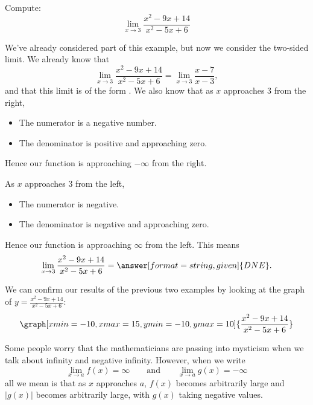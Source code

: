 \documentclass{ximera}
\begin{document}
\begin{example}
  Compute:
  \[
  \lim_{x\to 3} \frac{x^2-9x+14}{x^2-5x+6}
  \]
  \begin{explanation}
    We've already considered part of this example, but now we consider the two-sided limit. We already know that
    \[
    \lim_{x\to 3} \frac{x^2-9x+14}{x^2-5x+6} = \lim_{x\to
      3}\frac{x-7}{x-3},
    \]
    and that this limit is of the form \numOverZero.
    We also know that as $x$ approaches $3$ from the right,
    \begin{itemize}
    \item The numerator is a negative number. 
    \item The denominator is positive and approaching zero.
    \end{itemize}
    Hence our function is approaching $-\infty$ from the right.
    
    As $x$ approaches $3$ from the left,
    \begin{itemize}
    \item The numerator is negative.
    \item The denominator is negative and approaching zero.
    \end{itemize}
    Hence our function is approaching $\infty$ from the left.
    This means
    \[
    \lim_{x\to 3} \frac{x^2-9x+14}{x^2-5x+6} = \answer[format=string,given]{DNE}.
    \]
    \begin{onlineOnly}
     We can confirm our results of the previous two examples by looking at the graph of $y=\frac{x^2-9x+14}{x^2-5x+6}$:
     \[
     \graph[xmin=-10,xmax=15,ymin=-10,ymax=10]{\frac{x^2-9x+14}{x^2-5x+6}}
     \]
   \end{onlineOnly}
  \end{explanation}
\end{example}

Some people worry that the mathematicians are passing into mysticism
when we talk about infinity and negative infinity. However, when we write
\[
\lim_{x\to a} f(x) = \infty \qquad\text{and}\qquad \lim_{x\to a} g(x) = -\infty
\]
all we mean is that as $x$ approaches $a$, $f(x)$ becomes arbitrarily
large and $|g(x)|$ becomes arbitrarily large, with $g(x)$ taking
negative values.
\end{document}
